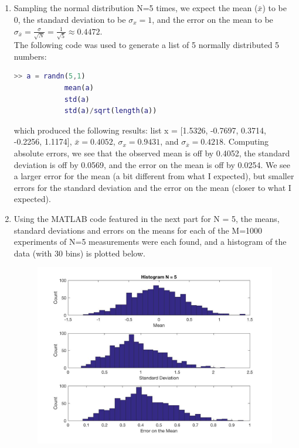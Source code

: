 \documentclass{article}
\begin{document}
    \subsection{}
        \begin{enumerate}
            \item Sampling the normal distribution N=5 times, we expect the mean ($\bar{x}$) to be 0, the standard deviation to be $\sigma_{x} = 1$, and the error on the mean to be $\sigma_{\bar{x}} = \frac{\sigma}{\sqrt{N}} = \frac{1}{\sqrt{5}} \approx 0.4472$.\\The following code was used to generate a list of 5 normally distributed 5 numbers:
            \begin{lstlisting}[language=Matlab, caption=Matlab code]
            >> a = randn(5,1)
            mean(a)
            std(a)
            std(a)/sqrt(length(a))
            \end{lstlisting}
            which produced the following results: list x = [1.5326, -0.7697, 0.3714, -0.2256, 1.1174], $\bar{x} = 0.4052$, $\sigma_{x} = 0.9431$, and $\sigma_{\bar{x}} = 0.4218$. Computing absolute errors, we see that the observed mean is off by 0.4052, the standard deviation is off by 0.0569, and the error on the mean is off by 0.0254. We see a larger error for the mean (a bit different from what I expected), but smaller errors for the standard deviation and the error on the mean (closer to what I expected). 
            \item Using the MATLAB code featured in the next part for N = 5, the means, standard deviations and errors on the means for each of the M=1000 experiments of N=5 measurements were each found, and a histogram of the data (with 30 bins) is plotted below.
            \begin{figure}[H]
    \centering
    \includegraphics[scale = 0.2]{3a.jpg}

\end{figure}
\end{enumerate}
\end{document}
